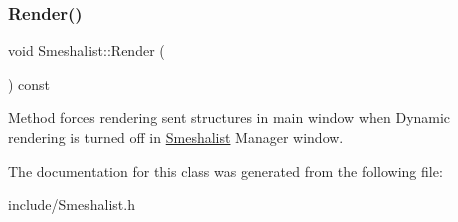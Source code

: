 \subsubsection{\texorpdfstring{Render()}{Render()}}
{\footnotesize\ttfamily void Smeshalist\+::\+Render (\begin{DoxyParamCaption}{ }\end{DoxyParamCaption}) const}

Method forces rendering sent structures in main window when \textquotesingle{}Dynamic rendering\textquotesingle{} is turned off in \hyperlink{class_smeshalist}{Smeshalist} Manager window. 

The documentation for this class was generated from the following file\+:\begin{DoxyCompactItemize}
\item 
include/Smeshalist.\+h\end{DoxyCompactItemize}

